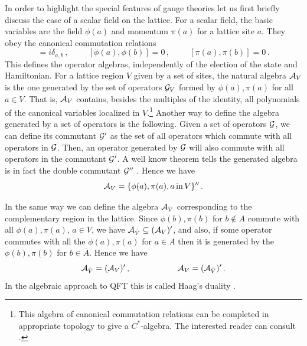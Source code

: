 \documentclass[12pt,a4paper]{article}
\begin{document}
In order to highlight the special features of gauge theories let us first briefly discuss the case of a scalar field on the lattice. For a 
scalar field, the basic variables are the field $\phi(a)$ and momentum $\pi(a)$ for a lattice site $a$. They obey the canonical commutation relations
\begin{equation}
[\phi(a),\pi(b)]=i \delta_{a, b}\,,\hspace{1cm}[\phi(a),\phi(b)]=0\,,\hspace{1cm}[\pi(a),\pi(b)]=0 \,.
\end{equation}
This defines the operator algebras, independently of the election of the state and Hamiltonian. 
For a lattice region $V$ given by a set of sites, the natural algebra ${\cal A}_V$ is the one generated by the set of operators ${\cal G}_V$ 
formed by  $\phi(a),\pi(a)$ for all $a\in V$. That is, ${\cal A}_V$ contains, besides the multiples of the identity, all polynomials of the 
canonical variables localized in $V$.\footnote{This algebra of canonical commutation relations can be completed in appropriate topology to give a $C^*$-algebra. 
The interested reader can consult \cite{brattel}.} Another way to define the algebra generated by a 
set of operators is the following. Given a set of operators ${\cal G}$, we can define its commutant ${\cal G}^\prime$ as the set 
of all operators which commute with all operators in ${\cal G}$. Then, an operator generated by ${\cal G}$ will also commute with all operators 
in the commutant ${\cal G}^\prime$. A well know theorem tells the generated algebra is in fact the double commutant ${\cal G}^{\prime\prime}$ \cite{well}. 
Hence we have
\begin{equation}
{\cal A}_V=\{\phi(a),\pi(a), a \,\textrm{in}\, V\}^{\prime\prime}\,.
\end{equation} 

In the same way we can define the algebra ${\cal A}_{\bar{V}}$ corresponding to the complementary region in the lattice.
Since $\phi(b), \pi(b)$ for $b\notin A$ commute with all $\phi(a),\pi(a)$, $a\in V$, we have ${\cal A}_{\bar{V}}\subseteq ({\cal A}_V)^\prime$, 
and also, if some operator commutes with all the $\phi(a),\pi(a)$ for $a\in A$ then it is generated by the $\phi(b),\pi(b)$ for $b\in \bar{A}$. Hence we have  
\begin{equation}
{\cal A}_{\bar{V}}=({\cal A}_V)^\prime\,,\hspace{2cm} {\cal A}_{V}=({\cal A}_{\bar{V}})^\prime\,.
\end{equation}
In the algebraic approach to QFT this is called Haag's duality \cite{haag}. 
\end{document}
